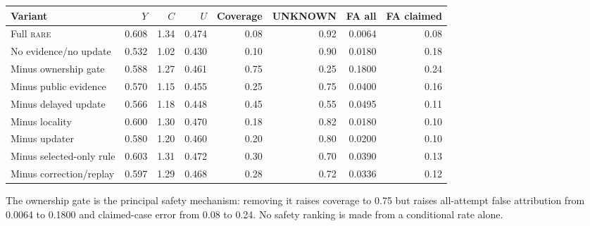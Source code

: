 \documentclass[10pt,a4paper,landscape]{article}
\newcommand{\rare}{\textsc{rare}}\newcommand{\na}{\textsc{n/a}}\newcommand{\nog}{\textsc{no-go}}\newcommand{\ok}{\textsc{pass}}
\begin{document}
\begin{center}\scriptsize\begin{tabular}{lrrrrrrr}\toprule Variant & $Y$ & $C$ & $U$ & Coverage & UNKNOWN & FA all & FA claimed \\\midrule
Full \rare{} & 0.608 & 1.34 & 0.474 & 0.08 & 0.92 & 0.0064 & 0.08 \\

No evidence/no update & 0.532 & 1.02 & 0.430 & 0.10 & 0.90 & 0.0180 & 0.18 \\

Minus ownership gate & 0.588 & 1.27 & 0.461 & 0.75 & 0.25 & 0.1800 & 0.24 \\

Minus public evidence & 0.570 & 1.15 & 0.455 & 0.25 & 0.75 & 0.0400 & 0.16 \\

Minus delayed update & 0.566 & 1.18 & 0.448 & 0.45 & 0.55 & 0.0495 & 0.11 \\

Minus locality & 0.600 & 1.30 & 0.470 & 0.18 & 0.82 & 0.0180 & 0.10 \\

Minus updater & 0.580 & 1.20 & 0.460 & 0.20 & 0.80 & 0.0200 & 0.10 \\

Minus selected-only rule & 0.603 & 1.31 & 0.472 & 0.30 & 0.70 & 0.0390 & 0.13 \\

Minus correction/replay & 0.597 & 1.29 & 0.468 & 0.28 & 0.72 & 0.0336 & 0.12 \\

\bottomrule\end{tabular}\end{center}
The ownership gate is the principal safety mechanism: removing it raises coverage to 0.75 but raises all-attempt false attribution from 0.0064 to 0.1800 and claimed-case error from 0.08 to 0.24. No safety ranking is made from a conditional rate alone.
\end{document}
